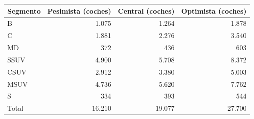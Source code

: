 \begin{tabular}{lrrr}
\toprule
Segmento & Pesimista (coches) & Central (coches) & Optimista (coches) \\
\midrule
B & 1.075 & 1.264 & 1.878 \\
C & 1.881 & 2.276 & 3.540 \\
MD & 372 & 436 & 603 \\
SSUV & 4.900 & 5.708 & 8.372 \\
CSUV & 2.912 & 3.380 & 5.003 \\
MSUV & 4.736 & 5.620 & 7.762 \\
S & 334 & 393 & 544 \\
Total & 16.210 & 19.077 & 27.700 \\
\bottomrule
\end{tabular}
